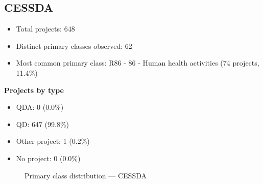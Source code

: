 \subsection{CESSDA}

\begin{itemize}
    \item Total projects: 648
    \item Distinct primary classes observed: 62
    \item Most common primary class: R86 - 86 - Human health activities (74 projects, 11.4\%)
\end{itemize}
\textbf{Projects by type}
\begin{itemize}
    \item QDA: 0 (0.0\%)
    \item QD: 647 (99.8\%)
    \item Other project: 1 (0.2\%)
    \item No project: 0 (0.0\%)
\end{itemize}

\begin{figure}[h]
    \centering
    
    \caption{Primary class distribution --- CESSDA}
\end{figure}

